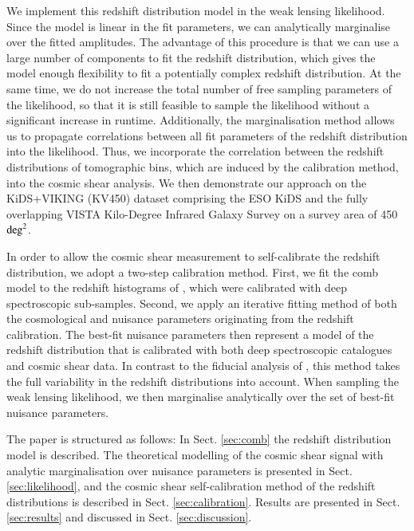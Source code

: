 \documentclass{aa}
\begin{document}
We implement this redshift distribution model in the weak lensing likelihood. Since the model is linear in the fit parameters, we can analytically marginalise over the fitted amplitudes. The advantage of this procedure is that we can use a large number of components to fit the redshift distribution, which gives the model enough flexibility to fit a potentially complex redshift distribution. At the same time, we do not increase the total number of free sampling parameters of the likelihood, so that it is still feasible to sample the likelihood without a significant increase in runtime. Additionally, the marginalisation method allows us to propagate correlations between all fit parameters of the redshift distribution into the likelihood. Thus, we incorporate the correlation between the redshift distributions of tomographic bins, which are induced by the calibration method, into the cosmic shear analysis. We then demonstrate our approach on the KiDS+VIKING (KV450) dataset comprising the ESO KiDS \citep{kuijken15, kuijken19,dejong15,dejong17} and the fully overlapping VISTA Kilo-Degree Infrared Galaxy Survey \citep[VIKING; ][]{2013Msngr.154...32E} on a survey area of 450 ${\rm deg}^2$.

In order to allow the cosmic shear measurement to self-calibrate the redshift distribution, we adopt a two-step calibration method. First, we fit the comb model to the redshift histograms of \cite{hildebrandt18}, which were calibrated with deep spectroscopic sub-samples. Second, we apply an iterative fitting method of both the cosmological and nuisance parameters originating from the redshift calibration. The best-fit nuisance parameters then represent a model of the redshift distribution that is calibrated with both deep spectroscopic catalogues and cosmic shear data. In contrast to the fiducial analysis of \cite{hildebrandt18}, this method takes the full variability in the redshift distributions into account. When sampling the weak lensing likelihood, we then marginalise analytically over the set of best-fit nuisance parameters.
 
The paper is structured as follows: In Sect. \ref{sec:comb} the redshift distribution model is described. The theoretical modelling of the cosmic shear signal with analytic marginalisation over nuisance parameters is presented in Sect. \ref{sec:likelihood}, and the cosmic shear self-calibration method of the redshift distributions is described in Sect. \ref{sec:calibration}. Results are presented in Sect. \ref{sec:results} and discussed in Sect. \ref{sec:discussion}.
 
\end{document}
